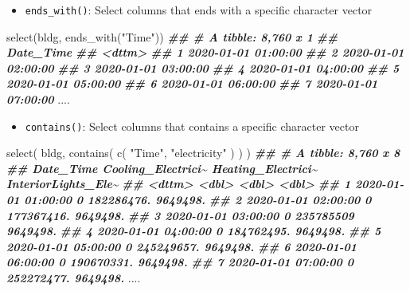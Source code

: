 \documentclass[
]{book}
\newenvironment{Shaded}{\begin{snugshade}}{\end{snugshade}}
\newcommand{\DocumentationTok}[1]{\textcolor[rgb]{0.56,0.35,0.01}{\textbf{\textit{#1}}}}
\newcommand{\FunctionTok}[1]{\textcolor[rgb]{0.00,0.00,0.00}{#1}}
\newcommand{\NormalTok}[1]{#1}
\newcommand{\StringTok}[1]{\textcolor[rgb]{0.31,0.60,0.02}{#1}}
\providecommand{\tightlist}{%
  \setlength{\itemsep}{0pt}\setlength{\parskip}{0pt}}
\begin{document}
\begin{itemize}
\tightlist
\item
  \texttt{ends\_with()}: Select columns that ends with a specific character vector
\end{itemize}

\begin{Shaded}
\begin{Highlighting}[]
\FunctionTok{select}\NormalTok{(bldg, }\FunctionTok{ends\_with}\NormalTok{(}\StringTok{"Time"}\NormalTok{))}
\DocumentationTok{\#\# \# A tibble: 8,760 x 1}
\DocumentationTok{\#\#    Date\_Time          }
\DocumentationTok{\#\#    \textless{}dttm\textgreater{}             }
\DocumentationTok{\#\#  1 2020{-}01{-}01 01:00:00}
\DocumentationTok{\#\#  2 2020{-}01{-}01 02:00:00}
\DocumentationTok{\#\#  3 2020{-}01{-}01 03:00:00}
\DocumentationTok{\#\#  4 2020{-}01{-}01 04:00:00}
\DocumentationTok{\#\#  5 2020{-}01{-}01 05:00:00}
\DocumentationTok{\#\#  6 2020{-}01{-}01 06:00:00}
\DocumentationTok{\#\#  7 2020{-}01{-}01 07:00:00}
\NormalTok{....}
\end{Highlighting}
\end{Shaded}

\begin{itemize}
\tightlist
\item
  \texttt{contains()}: Select columns that contains a specific character vector
\end{itemize}

\begin{Shaded}
\begin{Highlighting}[]
\FunctionTok{select}\NormalTok{(}
\NormalTok{  bldg,}
  \FunctionTok{contains}\NormalTok{(}
    \FunctionTok{c}\NormalTok{(}
      \StringTok{"Time"}\NormalTok{,}
      \StringTok{"electricity"}
\NormalTok{    )}
\NormalTok{  )}
\NormalTok{)}
\DocumentationTok{\#\# \# A tibble: 8,760 x 8}
\DocumentationTok{\#\#    Date\_Time           Cooling\_Electrici\textasciitilde{} Heating\_Electrici\textasciitilde{} InteriorLights\_Ele\textasciitilde{}}
\DocumentationTok{\#\#    \textless{}dttm\textgreater{}                           \textless{}dbl\textgreater{}              \textless{}dbl\textgreater{}               \textless{}dbl\textgreater{}}
\DocumentationTok{\#\#  1 2020{-}01{-}01 01:00:00                  0         182286476.            9649498.}
\DocumentationTok{\#\#  2 2020{-}01{-}01 02:00:00                  0         177367416.            9649498.}
\DocumentationTok{\#\#  3 2020{-}01{-}01 03:00:00                  0         235785509             9649498.}
\DocumentationTok{\#\#  4 2020{-}01{-}01 04:00:00                  0         184762495.            9649498.}
\DocumentationTok{\#\#  5 2020{-}01{-}01 05:00:00                  0         245249657.            9649498.}
\DocumentationTok{\#\#  6 2020{-}01{-}01 06:00:00                  0         190670331.            9649498.}
\DocumentationTok{\#\#  7 2020{-}01{-}01 07:00:00                  0         252272477.            9649498.}
\NormalTok{....}
\end{Highlighting}
\end{Shaded}
\end{document}
